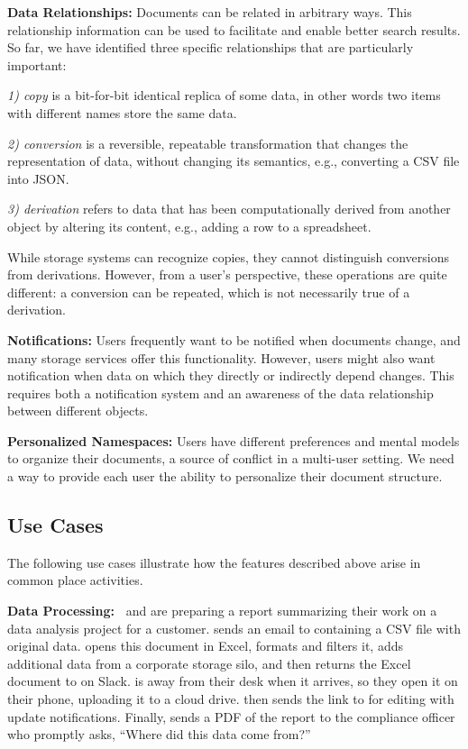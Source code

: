 \noindent\textbf{Data Relationships: }
Documents can be related in arbitrary ways. This relationship information can be used to facilitate and enable better search results. So far, we have identified three specific relationships that are particularly important:

\noindent\emph{1) copy} is a bit-for-bit identical replica of some data, in other words two items with different names store the same data.

\noindent \emph{2) conversion} is a reversible, repeatable transformation that changes the representation of data, without changing its semantics, e.g., converting a CSV file into JSON.

\noindent \emph{3) derivation} refers to data that has been computationally derived from another object by altering its content, e.g., adding a row to a spreadsheet.

While storage systems can recognize copies, they cannot distinguish conversions from derivations. However, from a user's perspective, these operations are quite different: a conversion can be repeated, which is not necessarily true of a derivation.

\noindent\textbf{Notifications:}
Users frequently want to be notified when documents change, and many storage services offer this functionality.
However, users might also want notification when data on which they directly or indirectly depend changes. This requires both a notification system and an awareness of the data relationship between different objects.

\noindent\textbf{Personalized Namespaces:}
Users have different preferences and mental models to organize their documents, a source of conflict in a multi-user setting. We need a way to provide each user the ability to personalize their document structure.

\subsection{Use Cases}
The following use cases illustrate how the features described above arise in common place activities.

\noindent\textbf{Data Processing:~}
\persa and \persc are preparing a report summarizing their work on a data analysis project for a customer.
\persc sends an email to \persa containing a CSV file with original data.
\persa opens this document in Excel, formats and filters it, adds additional data from a corporate storage silo,
and then returns the Excel document to \persc on Slack.
\persc is away from their desk when it arrives, so they open it on their phone, uploading it to a cloud drive.
\persc then sends the link to \persa for editing with update notifications.
Finally, \persc sends a PDF of the report to the compliance officer who promptly asks, ``Where did this data come from?''

